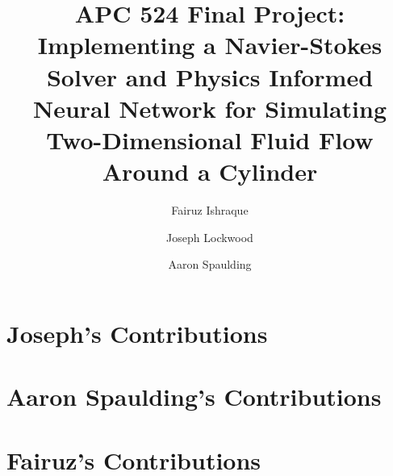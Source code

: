 \documentclass[11pt, letterpaper]{article}
\title{\titlefontlarge APC 524 Final Project:\\\titlefont Implementing a Navier-Stokes Solver and Physics Informed Neural Network for Simulating Two-Dimensional Fluid Flow Around a Cylinder}
\author[1]{Fairuz Ishraque}
\author[1]{Joseph Lockwood}
\author[2]{Aaron Spaulding}
\affil[1]{Department of Geosciences}
\affil[2]{Department of Civil and Environmental Engineering}
\date{}
\begin{document}
\maketitle
\newpage 
\tableofcontents

\newpage







\section{Joseph's Contributions}


\newpage
\section{Aaron Spaulding's Contributions}



\section{Fairuz's Contributions}


\newpage
\printbibliography
\end{document}
